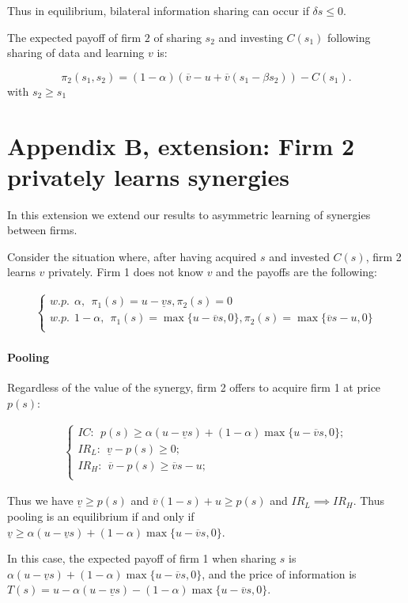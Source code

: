 \documentclass[a4paper,leqno]{article}%
\renewcommand{\a}{\alpha}
\newcommand{\uv}{\underline{v}}
\newcommand{\ov}{\overline{v}}
\begin{document}
Thus in equilibrium, bilateral information sharing can occur if $\delta s\leq0$.

The expected payoff of firm $2$ of sharing $s_2$ and investing $C(s_1)$ following sharing of data and learning $v$ is:


        $$\pi_2(s_1,s_2)=(1-\a)(\ov-u+\ov (s_1-\beta s_2))-C(s_1).$$
with $s_2\geq s_1$


\section{Appendix B, extension: Firm 2 privately learns synergies}

In this extension we extend our results to asymmetric learning of synergies between firms.

Consider the situation where, after having acquired $s$ and invested $C(s)$, firm 2 learns $v$ privately. Firm 1 does not know $v$ and the payoffs are the following:


\begin{align}\label{compbilmixed}
\begin{cases}
    w.p.~~ \a,~~ \pi_1(s)=u-\uv s, \pi_2(s)=0\\ 
    w.p.~~ 1-\a,~~ \pi_1(s)=\max\{u-\ov s,0\}, \pi_2(s)=\max\{\ov s-u,0\}\\ 
\end{cases}
\end{align}

\paragraph{Pooling}

Regardless of the value of the synergy, firm 2 offers to acquire firm 1 at price $p(s)$:

\begin{align}
\begin{cases}
    IC:~~ p(s)\geq \a(u-\uv s)+(1-\a)\max\{u-\ov s,0\};\\ 
    IR_L:~~ \uv -p(s)\geq 0;\\
    IR_H:~~ \ov -p(s)\geq \ov s-u;\\ 
\end{cases}
\end{align}


Thus we have $\uv \geq p(s)$ and $\ov(1-s)+u\geq p(s)$ and $IR_L\implies IR_H$. Thus pooling is an equilibrium if and only if $\uv\geq \a(u-\uv s)+(1-\a)\max\{u-\ov s,0\}$. 

In this case, the expected payoff of firm 1 when sharing $s$ is $\a(u-\uv s)+(1-\a)\max\{u-\ov s,0\}$, and the price of information is $T(s)=u-\a(u-\uv s)-(1-\a)\max\{u-\ov s,0\}$. 
\end{document}
